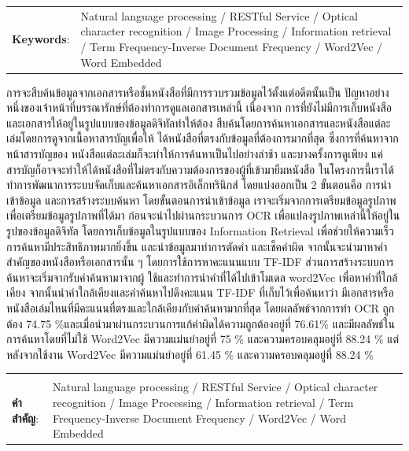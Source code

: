 \documentclass[12pt,oneside,openright,a4paper]{cpe-thai-project}
\begin{document}
\begin{flushleft}
\begin{tabular*}{\textwidth}{@{}lp{}}
\textbf{Keywords}: & Natural language processing / RESTful Service / Optical character recognition / Image Processing / Information retrieval / Term Frequency-Inverse Document Frequency / Word2Vec / Word Embedded 
\end{tabular*}
\end{flushleft}
\endabstract

\thaiabstract

การจะสืบค้นข้อมูลจากเอกสารหรือชั้นหนังสือที่มีการรวบรวมข้อมูลไว้ตั้งแต่อดีตนั้นเป็น
ปัญหาอย่างหนึ่งของเจ้าหน้าที่บรรณารักษ์ที่ต้องทำการดูแลเอกสารเหล่านี้ เนื่องจาก
การที่ยังไม่มีการเก็บหนังสือและเอกสารให้อยู่ในรูปแบบของข้อมูลดิจิทัลทำให้ต้อง
สืบค้นโดยการค้นหาเอกสารและหนังสือแต่ละเล่มโดยการดูจากเนื้อหาสารบัญเพื่อให้
ได้หนังสือที่ตรงกับข้อมูลที่ต้องการมากที่สุด ซึ่งการที่ค้นหาจากหน้าสารบัญของ
หนังสือแต่ละเล่มก็จะทำให้การค้นหาเป็นไปอย่างล่าช้า และบางครั้งการดูเพียง
แค่สารบัญก็อาจจะทำให้ได้หนังสือที่ไม่ตรงกับความต้องการของผู้ที่เข้ามายืมหนังสือ 
ในโครงการนี้เราได้ทำการพัฒนาการระบบจัดเก็บและค้นหาเอกสารอิเล็กทรินิกส์ 
โดยแบ่งออกเป็น 2 ขั้นตอนคือ การนำเข้าข้อมูล  และการสร้างระบบค้นหา 
โดยขั้นตอนการนำเข้าข้อมูล เราจะเริ่มจากการเตรียมข้อมูลรูปภาพ
เพื่อเตรียมข้อมูลรูปภาพที่ได้มา ก่อนจะนำไปผ่านกระบวนการ OCR 
เพื่อแปลงรูปภาพเหล่านี้ให้อยู่ในรูปของข้อมูลดิจิทัล โดยการเก็บข้อมูลในรูปแบบของ 
Information Retrieval เพื่อช่วยให้ความเร็วการค้นหามีประสิทธิภาพมากยิ่งขึ้น 
และนำข้อมูลมาทำการตัดคำ และเช็คคำผิด จากนั้นจะนำมาหาคำสำคัญของหนังสือหรือเอกสารนั้น ๆ
โดยการใช้การหาคะแนนแบบ TF-IDF ส่วนการสร้างระบบการค้นหาจะเริ่มจากรับคำค้นหามาจากผู้
ใช้และทำการนำคำที่ได้ไปเข้าโมเดล word2Vec เพื่อหาคำที่ใกล้เคียง 
จากนั้นนำคำใกล้เคียงและคำค้นหาไปดึงคะแนน TF-IDF ที่เก็บไว้เพื่อค้นหาว่า
มีเอกสารหรือหนังสือเล่มไหนที่มีคะแนนที่ตรงและใกล้เคียงกับคำค้นหามากที่สุด
โดยผลลัพธ์จากการทำ OCR ถูกต้อง 74.75 \%และเมื่อนำมาผ่านกระบวนการแก้คำผิดได้ความถูกต้องอยู่ที่ 76.61\%
และมีผลลัพธ์ในการค้นหาโดยที่ไม่ใช้ Word2Vec มีความแม่นยำอยู่ที่ 75 \% และความครอบคลุมอยู่ที่ 88.24 \% 
แต่หลังจากใช้งาน Word2Vec มีความแม่นยำอยู่ที่ 61.45 \% และความครอบคลุมอยู่ที่ 88.24 \%
\begin{flushleft}
\begin{tabular*}{\textwidth}{@{}lp{}}
 & \\

\textbf{คำสำคัญ}: & Natural language processing / RESTful Service / Optical character recognition / Image Processing / Information retrieval / Term Frequency-Inverse Document Frequency / Word2Vec / Word Embedded 
\end{tabular*}
\end{flushleft}
\endabstract
\end{document}
